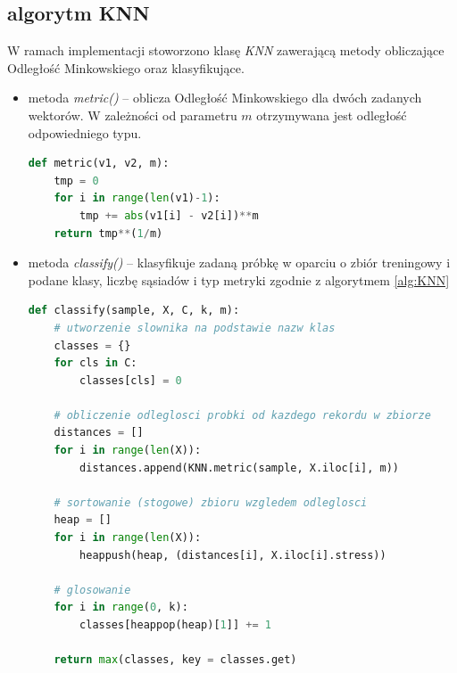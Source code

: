 \documentclass[12pt,a4paper]{article}
\begin{document}
        \subsection{algorytm KNN}
            W ramach implementacji stoworzono klasę \textit{KNN} zawerającą metody obliczające Odległość Minkowskiego oraz klasyfikujące.
            \begin{itemize}
                \item metoda \textit{metric()} -- oblicza Odległość Minkowskiego dla dwóch zadanych wektorów. W zależności od parametru $m$ otrzymywana jest odległość odpowiedniego typu.
                \begin{lstlisting}[language=Python, caption=metoda \textit{metric()}, label=lst:metric]
def metric(v1, v2, m):
    tmp = 0
    for i in range(len(v1)-1):
        tmp += abs(v1[i] - v2[i])**m
    return tmp**(1/m)
                \end{lstlisting}
                
                \item metoda \textit{classify()} -- klasyfikuje zadaną próbkę w oparciu o zbiór treningowy i podane klasy, liczbę sąsiadów i typ metryki zgodnie z algorytmem \ref{alg:KNN}
                \begin{lstlisting}[language=Python, caption=metoda \textit{classify()} w KNN, label=lst:classify]
def classify(sample, X, C, k, m):
    # utworzenie slownika na podstawie nazw klas
    classes = {}
    for cls in C:
        classes[cls] = 0
    
    # obliczenie odleglosci probki od kazdego rekordu w zbiorze
    distances = []
    for i in range(len(X)):
        distances.append(KNN.metric(sample, X.iloc[i], m))
    
    # sortowanie (stogowe) zbioru wzgledem odleglosci
    heap = []
    for i in range(len(X)):
        heappush(heap, (distances[i], X.iloc[i].stress))
    
    # glosowanie
    for i in range(0, k):
        classes[heappop(heap)[1]] += 1
    
    return max(classes, key = classes.get)
                \end{lstlisting}
                
            \end{itemize}
        
\end{document}
